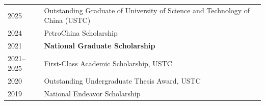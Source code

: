 
\begin{longtable}[l]{@{}p{} p{}@{}}

2025 & Outstanding Graduate of University of Science and Technology of China (USTC) \\

2024 & PetroChina Scholarship \\

2021 & \textbf{National Graduate Scholarship} \\

2021--2025 & First-Class Academic Scholarship, USTC \\

2020 & Outstanding Undergraduate Thesis Award, USTC \\

2019 & National Endeavor Scholarship \\

\end{longtable}
